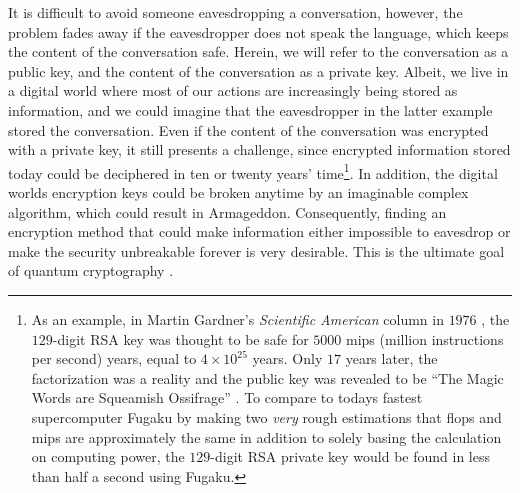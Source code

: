 It is difficult to avoid someone eavesdropping a conversation, however, the problem fades away if the eavesdropper does not speak the language, which keeps the content of the conversation safe. Herein, we will refer to the conversation as a public key, and the content of the conversation as a private key. Albeit, we live in a digital world where most of our actions are increasingly being stored as information, and we could imagine that the eavesdropper in the latter example stored the conversation. Even if the content of the conversation was encrypted with a private key, it still presents a challenge, since encrypted information stored today could be deciphered in ten or twenty years' time\footnote{As an example, in Martin Gardner's \textit{Scientific American} column in $1976$ \cite{Taubes1994}, the $129$-digit RSA key was thought to be safe for $5000$ mips (million instructions per second) years, equal to $4 \times 10^{25}$ years. Only $17$ years later, the factorization was a reality and the public key was revealed to be ``The Magic Words are Squeamish Ossifrage'' \cite{Atkins1995}. To compare to todays fastest supercomputer Fugaku \cite{Top500} by making two \textit{very} rough estimations that flops and mips are approximately the same in addition to solely basing the calculation on computing power, the $129$-digit RSA private key would be found in less than half a second using Fugaku.}. In addition, the digital worlds encryption keys could be broken anytime by an imaginable complex algorithm, which could result in Armageddon. Consequently, finding an encryption method that could make information either impossible to eavesdrop or make the security unbreakable forever is very desirable. This is the ultimate goal of quantum cryptography \cite{Pavicic2006}.


